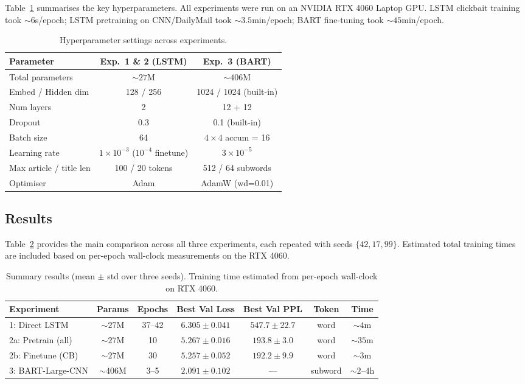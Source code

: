 \documentclass{article}
\begin{document}
Table~\ref{tab:hyperparams} summarises the key hyperparameters.
All experiments were run on an NVIDIA RTX 4060 Laptop GPU.
LSTM clickbait training took ${\sim}6$s/epoch; LSTM pretraining on CNN/DailyMail took ${\sim}3.5$min/epoch; BART fine-tuning took ${\sim}45$min/epoch.

\begin{table}[ht]
  \caption{Hyperparameter settings across experiments.}
  \label{tab:hyperparams}
  \centering
  \small
  \begin{tabular}{lcc}
    \toprule
    Parameter & Exp.~1 \& 2 (LSTM) & Exp.~3 (BART) \\
    \midrule
    Total parameters & ${\sim}27$M & ${\sim}406$M \\
    Embed / Hidden dim & 128 / 256 & 1024 / 1024 (built-in) \\
    Num layers & 2 & 12 + 12 \\
    Dropout & 0.3 & 0.1 (built-in) \\
    Batch size & 64 & $4 \times 4$ accum = 16 \\
    Learning rate & $1 \times 10^{-3}$ ($10^{-4}$ finetune) & $3 \times 10^{-5}$ \\
    Max article / title len & 100 / 20 tokens & 512 / 64 subwords \\
    Optimiser & Adam & AdamW (wd=0.01) \\
    \bottomrule
  \end{tabular}
\end{table}


\subsection{Results}

Table~\ref{tab:results} provides the main comparison across all three experiments, each repeated with seeds $\{42, 17, 99\}$.
Estimated total training times are included based on per-epoch wall-clock measurements on the RTX 4060.

\begin{table}[ht]
  \caption{Summary results (mean $\pm$ std over three seeds). Training time estimated from per-epoch wall-clock on RTX 4060.}
  \label{tab:results}
  \centering
  \small
  \begin{tabular}{lcccccc}
    \toprule
    Experiment & Params & Epochs & Best Val Loss & Best Val PPL & Token & Time \\
    \midrule
    1: Direct LSTM & ${\sim}27$M & 37--42 & $6.305 \pm 0.041$ & $547.7 \pm 22.7$ & word & ${\sim}4$m \\
    2a: Pretrain (all) & ${\sim}27$M & 10 & $5.267 \pm 0.016$ & $193.8 \pm 3.0$ & word & ${\sim}35$m \\
    2b: Finetune (CB) & ${\sim}27$M & 30 & $5.257 \pm 0.052$ & $192.2 \pm 9.9$ & word & ${\sim}3$m \\
    3: BART-Large-CNN & ${\sim}406$M & 3--5 & $2.091 \pm 0.102$ & --- & subword & ${\sim}2$--$4$h \\
    \bottomrule
  \end{tabular}
\end{table}
\end{document}

